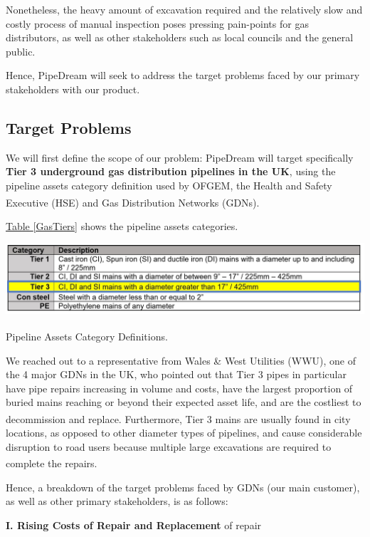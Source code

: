 \documentclass[11pt]{article}		%
\newcommand{\supercite}[1]{\textsuperscript{\cite{#1}}}		%
\newcommand{\tableref}[1]{\hyperref[#1]{Table \ref*{#1}}}     %
\begin{document}
		Nonetheless, the heavy amount of excavation required and the relatively slow and costly process of manual inspection poses pressing pain-points for gas distributors, as well as other stakeholders such as local councils and the general public. 
		
		Hence, PipeDream will seek to address the target problems faced by our primary stakeholders with our product. 

	\subsection[Target Problems]{Target Problems}
		We will first define the scope of our problem: PipeDream will target specifically \textbf{Tier 3 underground gas distribution pipelines in the UK}, using the pipeline assets category definition used by OFGEM, the Health and Safety Executive (HSE) and Gas Distribution Networks (GDNs)\supercite{pct2020states}. 
		
		\tableref{GasTiers} shows the pipeline assets categories. 
		
		\begin{table}[h]
			\centering
			\includegraphics[width=\textwidth]{GasTiers}
			\caption{Pipeline Assets Category Definitions\supercite{pct2020states}.}
			\label{GasTiers}
 		\end{table}
    
		We reached out to a representative from Wales \& West Utilities (WWU), one of the 4 major GDNs in the UK, who pointed out that Tier 3 pipes in particular have pipe repairs increasing in volume and costs, have the largest proportion of buried mains reaching or beyond their expected asset life, and are the costliest to decommission and replace\supercite{pct2020states}. Furthermore, Tier 3 mains are usually found in city locations, as opposed to other diameter types of pipelines, and cause considerable disruption to road users because multiple large excavations are required to complete the repairs\supercite{pct2020states}.
		
		Hence, a breakdown of the target problems faced by GDNs (our main customer), as well as other primary stakeholders, is as follows: 

        \textbf{I. Rising Costs of Repair and Replacement} 
        \linebreak of repair 
\end{document}
